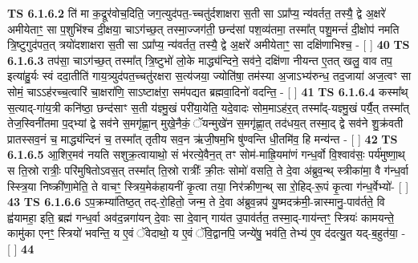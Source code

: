 \documentclass[17pt]{extarticle}
\begin{document}
                  \newline
                                \textbf{ TS 6.1.6.2} \newline
                  ति॑ मा क॒द्रूर॑वोच॒दिति॒ जग॒त्युद॑पत॒-च्चतु॑र्दशाक्षरा स॒ती सा ऽप्रा᳚प्य॒ न्य॑वर्तत॒ तस्यै॒ द्वे अ॒क्षरे॑ अमीयेताꣳ॒॒ सा प॒शुभि॑श्च दी॒क्षया॒ चाऽग॑च्छ॒त् तस्मा॒ज्जग॑ती॒ छन्द॑सां पश॒व्य॑तमा॒ तस्मा᳚त् पशु॒मन्तं॑ दी॒क्षोप॑ नमति त्रि॒ष्टुगुद॑पत॒त् त्रयो॑दशाक्षरा स॒ती सा ऽप्रा᳚प्य॒ न्य॑वर्तत॒ तस्यै॒ द्वे अ॒क्षरे॑ अमीयेताꣳ॒॒ सा दक्षि॑णाभिश्च॒ - [  ] \textbf{  40} \newline
                  \newline
                                \textbf{ TS 6.1.6.3} \newline
                  तप॑सा॒ चाऽग॑च्छ॒त् तस्मा᳚त् त्रि॒ष्टुभो॑ लो॒के माद्ध्य॑न्दिने॒ सव॑ने॒ दक्षि॑णा नीयन्त ए॒तत् खलु॒ वाव तप॒ इत्या॑हु॒र्यः स्वं ददा॒तीति॑ गाय॒त्र्युद॑पत॒च्चतु॑रक्षरा स॒त्य॑जया॒ ज्योति॑षा॒ तम॑स्या अ॒जाऽभ्य॑रुन्ध॒ तद॒जाया॑ अज॒त्वꣳ सा सोमं॒ चाऽऽह॑रच्च॒त्वारि॑ चा॒क्षरा॑णि॒ साऽष्टाक्ष॑रा॒ सम॑पद्यत ब्रह्मवा॒दिनो॑ वदन्ति॒ - [  ] \textbf{  41} \newline
                  \newline
                                \textbf{ TS 6.1.6.4} \newline
                  कस्मा᳚थ् स॒त्याद्-गा॑य॒त्री कनि॑ष्ठा॒ छन्द॑साꣳ स॒ती य॑ज्ञ्मु॒खं परी॑या॒येति॒ यदे॒वादः सोम॒माऽह॑र॒त् तस्मा᳚द्-यज्ञ्मु॒खं पर्यै॒त् तस्मा᳚त् तेज॒स्विनी॑तमा प॒द्भ्यां द्वे सव॑ने स॒मगृ॑ह्णा॒न् मुखे॒नैकं॒ ॅयन्मुखे॑न स॒मगृ॑ह्णा॒त् तद॑धय॒त् तस्मा॒द् द्वे सव॑ने शु॒क्र॑वती प्रातस्सव॒नं च॒ माद्ध्य॑न्दिनं च॒ तस्मा᳚त् तृतीय सव॒न ऋ॑जी॒षम॒भि षु॑ण्वन्ति धी॒तमि॑व॒ हि मन्य॑न्त - [  ] \textbf{  42} \newline
                  \newline
                                \textbf{ TS 6.1.6.5} \newline
                  आ॒शिर॒मव॑ नयति सशुक्र॒त्वायाथो॒ सं भ॑रत्ये॒वैन॒त् तꣳ सोम॑-माह्रि॒यमा॑णं गन्ध॒र्वो वि॒श्वाव॑सः॒ पर्य॑मुष्णा॒थ् स ति॒स्रो रात्रीः॒ परि॑मुषितोऽवस॒त् तस्मा᳚त् ति॒स्रो रात्रीः᳚ क्री॒तः सोमो॑ वसति॒ ते दे॒वा अ॑ब्रुव॒न्थ् स्त्रीका॑मा॒ वै ग॑न्ध॒र्वा स्स्त्रि॒या निष्क्री॑णा॒मेति॒ ते वाचꣳ॒॒ स्त्रिय॒मेक॑हायनीं कृ॒त्वा तया॒ निर॑क्रीण॒न्थ् सा रो॒हिद्-रू॒पं कृ॒त्वा ग॑न्ध॒र्वेभ्यो॑- [  ] \textbf{  43} \newline
                  \newline
                                \textbf{ TS 6.1.6.6} \newline
                  ऽप॒क्रम्या॑तिष्ठ॒त् तद्-रो॒हितो॒ जन्म॒ ते दे॒वा अ॑ब्रुव॒न्नप॑ यु॒ष्मदक्र॑मी॒-न्नास्मानु॒-पाव॑र्तते॒ वि ह्व॑यामहा॒ इति॒ ब्रह्म॑ गन्ध॒र्वा अव॑द॒न्नगा॑यन् दे॒वाः सा दे॒वान् गाय॑त उ॒पाव॑र्तत॒ तस्मा॒द्-गाय॑न्तꣳ॒॒ स्त्रियः॑ कामयन्ते॒ कामु॑का एनꣳ॒॒ स्त्रियो॑ भवन्ति॒ य ए॒वं ॅवेदाथो॒ य ए॒वं ॅवि॒द्वानपि॒ जन्ये॑षु॒ भव॑ति॒ तेभ्य॑ ए॒व द॑दत्यु॒त यद्-ब॒हुत॑या॒ - [  ] \textbf{  44} \newline
\end{document}
